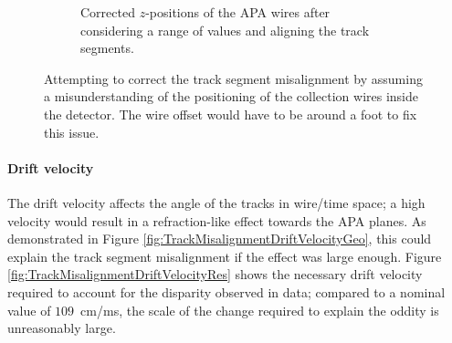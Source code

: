 \begin{figure}
\begin{subfigure}[t]{0.48\linewidth}
    \caption{Corrected $z$-positions of the APA wires after considering a range of values and aligning the track segments.}
    \label{fig:TrackMisalignmentZPositionRes}
  \end{subfigure}
  \caption[Attempting to correct the track segment misalignment by assuming a misunderstanding of the positioning of the collection wires inside the detector.]{Attempting to correct the track segment misalignment by assuming a misunderstanding of the positioning of the collection wires inside the detector.  The wire offset would have to be around a foot to fix this issue.}
  \label{fig:TrackMisalignmentZPosition}
\end{figure}

\paragraph{Drift velocity}

The drift velocity affects the angle of the tracks in wire/time space; a high velocity would result in a refraction-like effect towards the APA planes.  As demonstrated in Figure \ref{fig:TrackMisalignmentDriftVelocityGeo}, this could explain the track segment misalignment if the effect was large enough.  Figure \ref{fig:TrackMisalignmentDriftVelocityRes} shows the necessary drift velocity required to account for the disparity observed in data; compared to a nominal value of $109$~cm/ms, the scale of the change required to explain the oddity is unreasonably large.

